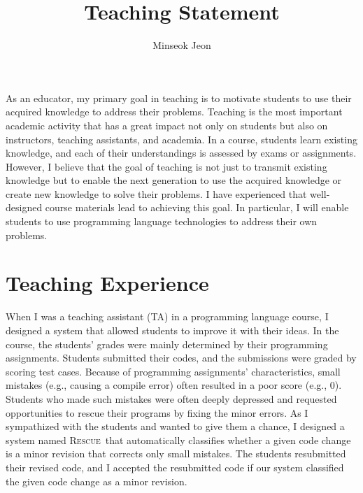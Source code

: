 \documentclass[11pt]{article}
\newcommand{\Rescue}{\textsc{Rescue}}
\begin{document}
\title{Teaching Statement}
\author{Minseok Jeon}
\date{}

\maketitle




As an educator, my primary goal in teaching is to motivate students to use their acquired knowledge to address their problems. 
% 
Teaching is the most important academic activity that has a great impact not only on students but also on instructors, teaching assistants, and academia. 
% 
In a course, students learn existing knowledge, and each of their understandings is assessed by exams or assignments.
% 
However, I believe that the goal of teaching is not just to transmit existing knowledge but to enable the next generation to use the acquired knowledge or create new knowledge to solve their problems. 
% 
I have experienced that well-designed course materials lead to achieving this goal.
%
In particular, I will enable students to use programming language technologies to address their own problems.









\section{Teaching Experience}
When I was a teaching assistant (TA) in a programming language course, I designed a system that allowed students to improve it with their ideas.
%
In the course, the students' grades were mainly determined by their programming assignments.
%
Students submitted their codes, and the submissions were graded by scoring test cases.
%
Because of programming assignments' characteristics, small mistakes (e.g., causing a compile error) often resulted in a poor score (e.g., 0).
%
Students who made such mistakes were often deeply depressed and requested opportunities to rescue their programs by fixing the minor errors. 
%
As I sympathized with the students and wanted to give them a chance, I designed a system named \Rescue~that automatically classifies whether a given code change is a minor revision that corrects only small mistakes. 
%
The students resubmitted their revised code, and I accepted the resubmitted code if our system classified the given code change as a minor revision.
\end{document}
